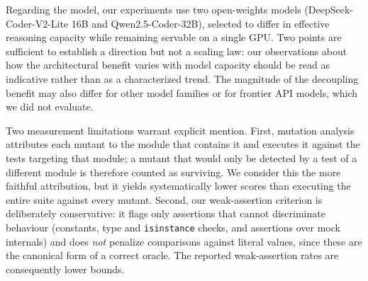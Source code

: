Regarding the model, our experiments use two open-weights models
(DeepSeek-Coder-V2-Lite 16B and Qwen2.5-Coder-32B), selected to differ in effective
reasoning capacity while remaining servable on a single GPU. Two points are
sufficient to establish a direction but not a scaling law: our observations about how
the architectural benefit varies with model capacity should be read as indicative
rather than as a characterized trend. The magnitude of the decoupling benefit may
also differ for other model families or for frontier API models, which we did not
evaluate.


Two measurement limitations warrant explicit mention. First, mutation analysis
attributes each mutant to the module that contains it and executes it against the
tests targeting that module; a mutant that would only be detected by a test of a
different module is therefore counted as surviving. We consider this the more
faithful attribution, but it yields systematically lower scores than executing the
entire suite against every mutant. Second, our weak-assertion criterion is
deliberately conservative: it flags only assertions that cannot discriminate
behaviour (constants, type and \texttt{isinstance} checks, and assertions over mock
internals) and does \emph{not} penalize comparisons against literal values, since
these are the canonical form of a correct oracle. The reported weak-assertion rates
are consequently lower bounds.


